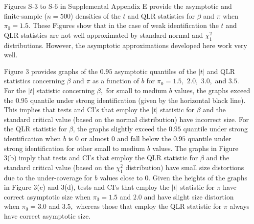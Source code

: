 \documentclass[12pt,thmsb,titlepage,final,oneside,letterpaper]{article}
\begin{document}
Figures S-3 to S-6 in Supplemental Appendix E provide the asymptotic and
finite-sample ($n=500$) densities of the $t$ and QLR statistics for $\beta $
and $\pi $ when $\pi _{0}=1.5.$ These Figures show that in the case of weak
identification the $t$ and QLR statistics are not well approximated by
standard normal and $\chi _{1}^{2}$ distributions. However, the asymptotic
approximations developed here work very well.



Figure 3 provides graphs of the $0.95$ asymptotic quantiles of the $|t|$ and
QLR statistics concerning $\beta $ and $\pi $ as a function of $b$ for $\pi
_{0}=1.5,$ $2.0,$ $3.0,$ and $3.5.$ For the $|t|$ statistic concerning $%
\beta ,$ for small to medium $b$ values, the graphs exceed the $0.95$
quantile under strong identification (given by the horizontal black line).
This implies that tests and CI's that employ the $|t|$ statistic for $\beta $
and the standard critical value (based on the normal distribution) have
incorrect size. For the QLR statistic for $\beta $, the graphs slightly
exceed the $0.95$ quantile under strong identification when $b$ is $0$ or
almost $0$ and fall below the $0.95$ quantile under strong identification
for other small to medium $b$ values. The graphs in Figure 3(b) imply that
tests and CI's that employ the QLR statistic for $\beta $ and the standard
critical value (based on the $\chi _{1}^{2}$ distribution) have small size
distortions due to the under-coverage for $b$ values close to $0.$ Given the
heights of the graphs in Figure 3(c) and 3(d), tests and CI's that employ
the $|t|$ statistic for $\pi $ have correct asymptotic size when $\pi
_{0}=1.5$ and $2.0$ and have slight size distortion when $\pi _{0}=3.0$ and $%
3.5,$ whereas those that employ the QLR statistic for $\pi $ always have
correct asymptotic size.
\end{document}
